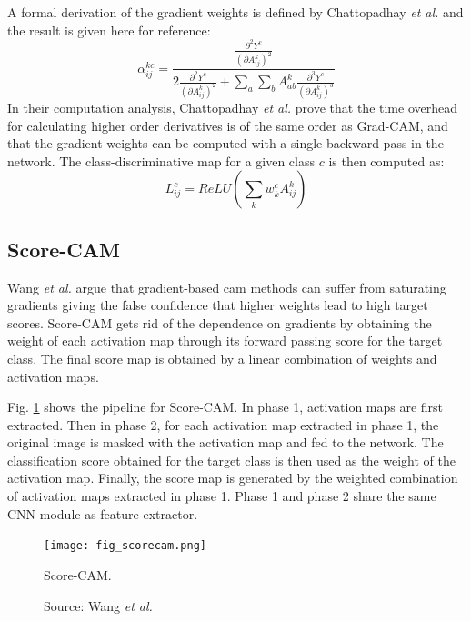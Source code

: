 A formal derivation of the gradient weights is defined by Chattopadhay \textit{et al.} \cite{chattopadhay2018grad} and the result is given here for reference:
\begin{equation}
    \alpha_{ij}^{kc} = \frac{\frac{\partial^{2}{Y^c}}{\left( \partial{A_{ij}^{k}} \right)^2}}{2\frac{\partial^{2}{Y^c}}{\left( \partial{A_{ij}^{k}} \right)^2} + \sum_a \sum_b A_{ab}^{k} {\frac{\partial^{3}{Y^c}}{\left( \partial{A_{ij}^{k}} \right)^3}} }
\end{equation}
In their computation analysis, Chattopadhay \textit{et al.} \cite{chattopadhay2018grad} prove that the time overhead for calculating higher order derivatives is of the same order as Grad-CAM, and that the gradient weights can be computed with a single backward pass in the network. The class-discriminative map for a given class $c$ is then computed as:
\begin{equation}
    L_{ij}^{c} = ReLU \left( \sum_{k}w_{k}^{c} A_{ij}^{k} \right)
\end{equation}

\subsection{Score-CAM}
Wang \textit{et al.} \cite{wang2020score} argue that gradient-based \acrshort{cam} methods can suffer from saturating gradients giving the false confidence that higher weights lead to high target scores. Score-CAM gets rid of the dependence on gradients by obtaining the weight of each activation map through its forward passing score for the target class. The final score map is obtained by a linear combination of weights and activation maps.

Fig. \ref{fig:scorecam} shows the pipeline for Score-CAM. In phase 1, activation maps are first extracted. Then in phase 2, for each activation map extracted in phase 1, the original image is masked with the activation map and fed to the network. The classification score obtained for the target class is then used as the weight of the activation map. Finally, the score map is generated by the weighted combination of activation maps extracted in phase 1. Phase 1 and phase 2 share the same CNN module as feature extractor. 
\begin{figure}[h]
    \begin{center}       
    \texttt{[image: fig\_scorecam.png]}
    \caption[Score-CAM]{Score-CAM.}
    \caption*{Source: Wang \textit{et al.} \cite{wang2020score}}
    \label{fig:scorecam}
    \end{center}
\end{figure}

